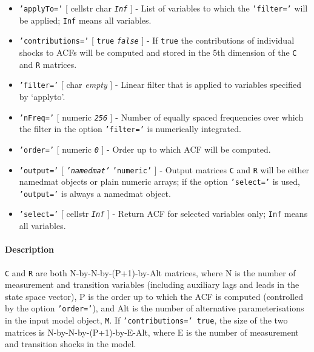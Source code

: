 \begin{itemize}
\item
  \texttt{'applyTo='} {[} cellstr \textbar{} char \textbar{}
  \emph{\texttt{Inf}} {]} - List of variables to which the
  \texttt{'filter='} will be applied; \texttt{Inf} means all variables.
\item
  \texttt{'contributions='} {[} \texttt{true} \textbar{}
  \emph{\texttt{false}} {]} - If \texttt{true} the contributions of
  individual shocks to ACFs will be computed and stored in the 5th
  dimension of the \texttt{C} and \texttt{R} matrices.
\item
  \texttt{'filter='} {[} char \textbar{} \emph{empty} {]} - Linear
  filter that is applied to variables specified by `applyto'.
\item
  \texttt{'nFreq='} {[} numeric \textbar{} \emph{\texttt{256}} {]} -
  Number of equally spaced frequencies over which the filter in the
  option \texttt{'filter='} is numerically integrated.
\item
  \texttt{'order='} {[} numeric \textbar{} \emph{\texttt{0}} {]} - Order
  up to which ACF will be computed.
\item
  \texttt{'output='} {[} \emph{\texttt{'namedmat'}} \textbar{}
  \texttt{'numeric'} {]} - Output matrices \texttt{C} and \texttt{R}
  will be either namedmat objects or plain numeric arrays; if the option
  \texttt{'select='} is used, \texttt{'output='} is always a namedmat
  object.
\item
  \texttt{'select='} {[} cellstr \textbar{} \emph{\texttt{Inf}} {]} -
  Return ACF for selected variables only; \texttt{Inf} means all
  variables.
\end{itemize}

\paragraph{Description}\label{description}

\texttt{C} and \texttt{R} are both N-by-N-by-(P+1)-by-Alt matrices,
where N is the number of measurement and transition variables (including
auxiliary lags and leads in the state space vector), P is the order up
to which the ACF is computed (controlled by the option
\texttt{'order='}), and Alt is the number of alternative
parameterisations in the input model object, \texttt{M}. If
\texttt{'contributions=' true}, the size of the two matrices is
N-by-N-by-(P+1)-by-E-Alt, where E is the number of measurement and
transition shocks in the model.

